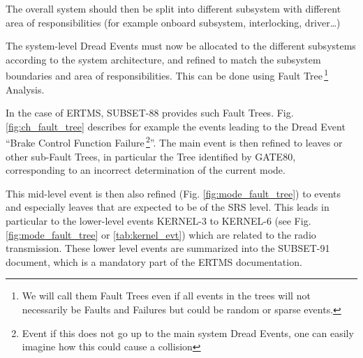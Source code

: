 \documentclass{template/openetcs_article}
\begin{document}
The overall system should then be split into different subsystem with different area of responsibilities
(for example onboard subsystem, interlocking, driver\dots)

The system-level Dread Events must now be allocated to the different subsystems according to the system
architecture, and refined to 
match the subsystem boundaries and area of responsibilities. This can be done using 
Fault Tree\,\footnote{We will call them Fault Trees even if all events in the trees will not necessarily
be Faults and Failures but could be random or sparse events.} Analysis.

In the case of ERTMS, SUBSET-88 provides such Fault Trees. Fig. \ref{fig:ch_fault_tree} describes for
example the events leading to the Dread Event ``Brake Control Function Failure\,\footnote{Event
if this does not go up to the main system Dread Events, one can easily imagine how this 
could cause a collision}''. The main event is then refined to leaves or other sub-Fault Trees, 
in particular the Tree identified by GATE80, corresponding to an incorrect determination of the 
current mode. 

This mid-level event is then also refined (Fig. \ref{fig:mode_fault_tree}) to events and especially 
leaves that are expected to be of the SRS level. This leads in particular to the lower-level events
KERNEL-3 to KERNEL-6 (see Fig. \ref{fig:mode_fault_tree} or \ref{tab:kernel_evt}) which are related 
to the radio transmission. These lower level events are 
summarized into the SUBSET-91 document, which is a mandatory part of the ERTMS documentation.
\end{document}
